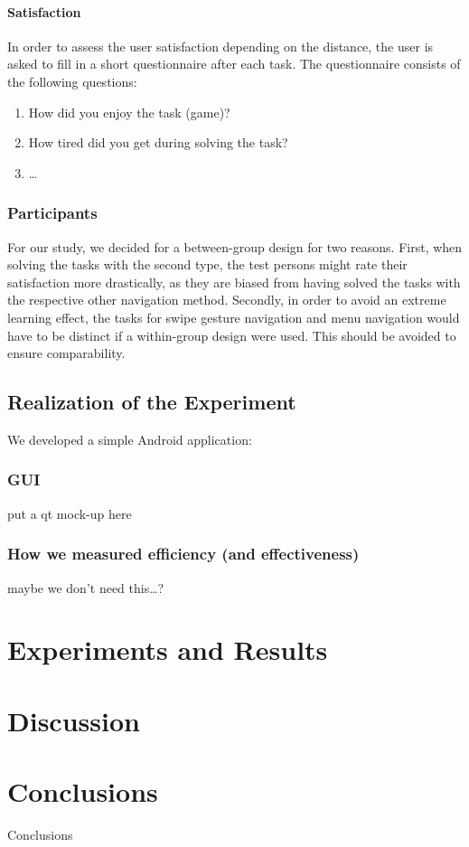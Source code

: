 \documentclass{sig-alternate-05-2015}
\begin{document}
\paragraph{Satisfaction}
In order to assess the user satisfaction depending on the distance, the user is asked to fill in a short questionnaire after each task. 
The questionnaire consists of the following questions:
\begin{enumerate}
  \item How did you enjoy the task (game)?
  \item How tired did you get during solving the task?
  \item \ldots
\end{enumerate}
\subsubsection{Participants}
For our study, we decided for a between-group design for two reasons. First, when solving the tasks with the second type, the test persons might rate their satisfaction more drastically, as they
are biased from having solved the tasks with the respective other navigation method. Secondly, in order to avoid an extreme learning effect, the tasks for swipe gesture navigation and menu navigation
would have to be distinct if a within-group design were used. This should be avoided to ensure comparability.
\subsection{Realization of the Experiment}
We developed a simple Android application:
\subsubsection{GUI}
put a qt mock-up here
\subsubsection{How we measured efficiency (and effectiveness)}
maybe we don't need this\ldots?
\section{Experiments and Results}
\section{Discussion}

\section{Conclusions}
Conclusions
\end{document}

